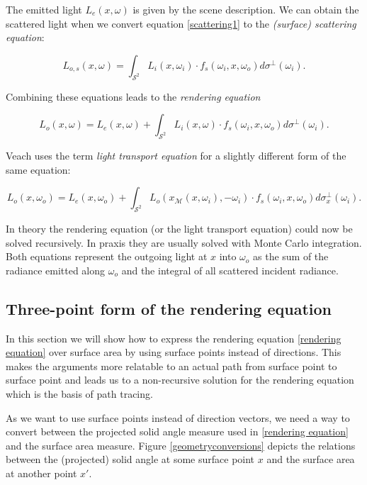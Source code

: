 The emitted light $L_e(x,\omega)$ is given by the scene description. We can obtain the scattered light when we convert equation \ref{scattering1} to the \emph{(surface) scattering equation}:

\begin{equation}
\label{scattering equation}
L_{o,s}(x,\omega) = \int_{\mathcal{S}^2}  L_i(x,\omega_i) \cdot f_s(\omega_i,x,\omega_o) d\sigma^\bot(\omega_i).
\end{equation}

Combining these equations leads to the \emph{rendering equation}

\begin{equation}
\label{rendering equation}
L_o(x,\omega) = L_e(x,\omega) + \int_{\mathcal{S}^2}L_i(x,\omega) \cdot f_s(\omega_i,x,\omega_o)d\sigma^\bot(\omega_i).
\end{equation}

Veach \cite[chapter 3.7.2]{veachdiss} uses the term \emph{light transport equation} for a slightly different form of the same equation:

\begin{equation*}
L_o(x,\omega_o) = L_e(x,\omega_o) + \int_{\mathcal{S}^2} L_o(x_\mathcal{M}(x,\omega_i),-\omega_i) \cdot f_s(\omega_i,x,\omega_o)d\sigma^\bot_x(\omega_i).
\end{equation*}

In theory the rendering equation (or the light transport equation) could now be solved recursively. In praxis they are usually solved with Monte Carlo integration.\\
Both equations represent the outgoing light at $x$ into $\omega_o$ as the sum of the radiance emitted along $\omega_o$ and the integral of all scattered incident radiance.






\subsection{Three-point form of the rendering equation}

In this section we will show how to express the rendering equation \ref{rendering equation} over surface area by using surface points instead of directions. This makes the arguments more relatable to an actual path from surface point to surface point and leads us to a non-recursive solution for the rendering equation which is the basis of path tracing.

As we want to use surface points instead of direction vectors, we need a way to convert between the projected solid angle measure used in \ref{rendering equation} and the surface area measure. Figure \ref{geometryconversions} depicts the relations between the (projected) solid angle at some surface point $x$ and the surface area at another point $x'$.


